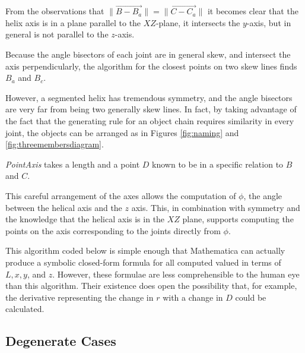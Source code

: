 \documentclass[11pt]{article}
\begin{document}
{From the observations that $\| \overrightarrow{B - B_a} \| = \| \overrightarrow{C - C_a} \|$
it becomes clear that the helix axis is in a plane
parallel to the $XZ$-plane, it intersects the $y$-axis, but in general is
not parallel to the $z$-axis.

Because the angle bisectors of each joint are in general skew, and intersect the
axis perpendicularly, the algorithm
for the closest points on two skew lines finds $B_a$ and $B_c$.

However, a segmented helix has
tremendous symmetry, and the angle bisectors are very far from being two
generally skew lines. In fact, by taking advantage of the fact that the
generating rule for an object chain requires similarity in every joint,
the objects can be arranged as in Figures \ref{fig:naming} and \ref{fig:threemembersdiagram}.

{\em PointAxis} takes a length and a point $D$ known to be in
a specific relation to $B$ and $C$.

This careful arrangement of the axes
allows the computation of $\phi$, the angle between the helical axis
and the $z$ axis. This, in combination with symmetry and the knowledge
that the helical axis is in the $XZ$ plane, supports computing the
points on the axis corresponding to the joints directly from $\phi$.

This algorithm coded below is simple enough that Mathematica\cite{Mathematica} can
actually produce a symbolic closed-form formula for all computed valued
in terms of $L, x, y$, and $z$.
However, these formulae are less comprehensible to the
human eye than this algorithm.
Their existence does open
the possibility that, for example, the derivative representing
the change in $r$ with a change in $D$ could be calculated.

\subsection{Degenerate Cases}

}
\end{document}

